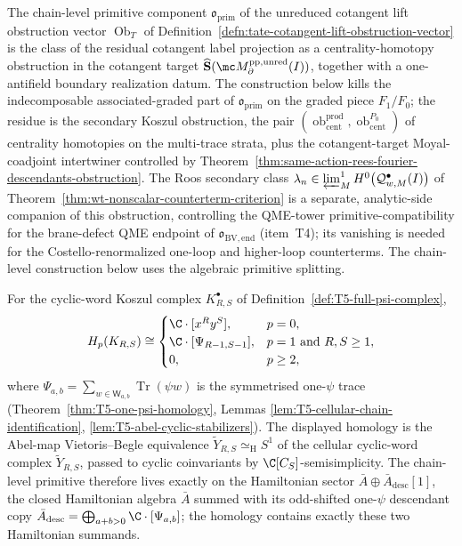 The chain-level primitive component
\(\mathfrak o_{\mathrm{prim}}\) of the unreduced cotangent lift
obstruction vector
\(\operatorname{Ob}_T\) of
Definition~\ref{defn:tate-cotangent-lift-obstruction-vector} is the
class of the residual cotangent label projection as a centrality-homotopy
obstruction in the cotangent target
\(\widehat{\mathbf S}(\mc M^{\mathrm{pp,unred}}_\partial(I))\),
together with a one-antifield boundary realization datum.  The
construction below kills the indecomposable associated-graded part of
\(\mathfrak o_{\mathrm{prim}}\) on the graded piece \(F_1/F_0\); the residue is
the secondary Koszul obstruction, the pair
\((\operatorname{ob}_{\mathrm{cent}}^{\mathrm{prod}},
\operatorname{ob}_{\mathrm{cent}}^{P_0})\) of centrality homotopies
on the multi-trace strata, plus the cotangent-target Moyal-coadjoint
intertwiner controlled by
Theorem~\ref{thm:same-action-rees-fourier-descendants-obstruction}.  The Roos
secondary class
\(\lambda_n\in
\varprojlim^1_M H^0\bigl(\mathcal Q^\bullet_{w,M}(I)\bigr)\) of
Theorem~\ref{thm:wt-nonscalar-counterterm-criterion} is a separate,
analytic-side companion of this obstruction, controlling the
QME-tower primitive-compatibility for the brane-defect QME endpoint
of \(\mathfrak o_{\mathrm{BV,end}}\) (item~T4); its vanishing is
needed for the Costello-renormalized one-loop and higher-loop
counterterms. The chain-level construction below uses the algebraic
primitive splitting.

For the cyclic-word Koszul complex \(K^\bullet_{R,S}\) of
Definition~\ref{def:T5-full-psi-complex},
\[
  H_p(K_{R,S})\cong\begin{cases}
    \C\cdot[x^Ry^S], & p=0,\\
    \C\cdot[\Psi_{R-1,S-1}], & p=1\text{ and }R,S\geq1,\\
    0, & p\geq2,
  \end{cases}
\]
where \(\Psi_{a,b}=\sum_{w\in\mathsf W_{a,b}}\operatorname{Tr}(\psi w)\)
is the symmetrised one-\(\psi\) trace
(Theorem~\ref{thm:T5-one-psi-homology}, Lemmas
\ref{lem:T5-cellular-chain-identification},
\ref{lem:T5-abel-cyclic-stabilizers}).  The displayed homology is the
Abel-map Vietoris--Begle equivalence
\(\widetilde Y_{R,S}\simeq_{\mathrm H}S^1\) of the cellular cyclic-word
complex \(\widetilde Y_{R,S}\), passed to cyclic coinvariants by
\(\C[C_S]\)-semisimplicity.  The chain-level primitive therefore lives
exactly on the Hamiltonian sector
\(\bar A\oplus\bar A_{\mathrm{desc}}[1]\), the closed Hamiltonian
algebra \(\bar A\) summed with its odd-shifted one-\(\psi\) descendant
copy
\(\bar A_{\mathrm{desc}}=\bigoplus_{a+b>0}\C\cdot[\Psi_{a,b}]\); the
homology contains exactly these two Hamiltonian summands.

